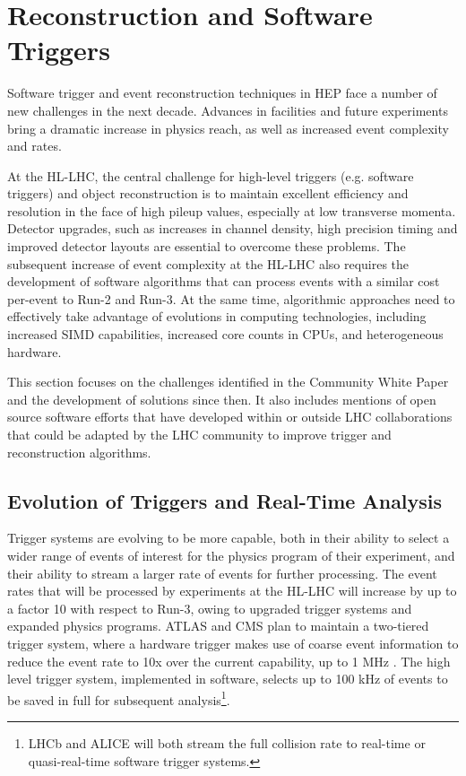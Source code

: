 \hypertarget{reconstruction-and-software-triggers}{%
\section{Reconstruction and Software
Triggers}\label{reconstruction-and-software-triggers}}

Software trigger and event reconstruction techniques in HEP face a
number of new challenges in the next decade. Advances in facilities and
future experiments bring a dramatic increase in physics reach, as well
as increased event complexity and rates.

At the HL-LHC, the central challenge for high-level triggers (e.g.
software triggers) and object reconstruction is to maintain excellent
efficiency and resolution in the face of high pileup values, especially
at low transverse momenta. Detector upgrades, such as increases in
channel density, high precision timing and improved detector layouts are
essential to overcome these problems. The subsequent increase of event
complexity at the HL-LHC also requires the development of software
algorithms that can process events with a similar cost per-event to
Run-2 and Run-3. At the same time, algorithmic approaches need to
effectively take advantage of evolutions in computing technologies,
including increased SIMD capabilities, increased core counts in CPUs,
and heterogeneous hardware.

This section focuses on the challenges identified in the Community White
Paper~\cite{Alves:2017she,albrecht2018hepexec,albrecht2018hep} and the
development of solutions since then. It also includes
mentions of open source software efforts that have developed within or
outside LHC collaborations that could be adapted by the LHC community to
improve trigger and reconstruction algorithms.

\hypertarget{the-evolution-of-triggers-and-real-time-analysis}{%
\subsection{Evolution of Triggers and Real-Time Analysis}\label{the-evolution-of-triggers-and-real-time-analysis}}

Trigger systems are evolving to be more capable, both in their ability
to select a wider range of events of interest for the physics program of
their experiment, and their ability to stream a larger rate of events
for further processing. The event rates that will be processed by
experiments at the HL-LHC will increase by up to a factor 10 with
respect to Run-3, owing to upgraded trigger systems and expanded physics
programs. ATLAS and CMS plan to maintain a two-tiered trigger system,
where a hardware trigger makes use of coarse event information to reduce
the event rate to 10x over the current capability, up to 1 MHz \cite{ATLAS-TDR-29,collaboration:2714892}. The high level trigger system, implemented in software, selects
up to 100 kHz of events to be saved in full for subsequent
analysis\footnote{LHCb \cite{Aaij:2019uij} and ALICE \cite{Buncic:2011297} will both
  stream the full collision rate to real-time or quasi-real-time software
  trigger systems.}.

